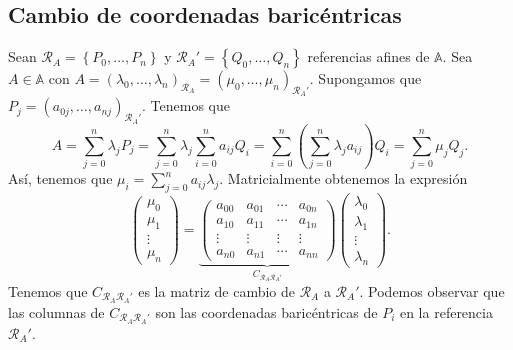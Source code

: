 \subsection{Cambio de coordenadas baricéntricas}
Sean $\displaystyle \mathcal{R}_{A} = \left\{ P_{0}, \ldots, P_{n}\right\}  $ y $\displaystyle \mathcal{R}_{A}' = \left\{ Q_{0}, \ldots, Q_{n}\right\}  $ referencias afines de $\displaystyle \mathbb{A} $. Sea $\displaystyle A \in \mathbb{A} $ con $\displaystyle A = \left(\lambda_{0}, \ldots, \lambda_{n}\right)_{\mathcal{R}_{A}} = \left(\mu_{0}, \ldots, \mu_{n}\right)_{\mathcal{R}_{A}'} $. Supongamos que $\displaystyle P_{j} = \left(a_{0j}, \ldots, a_{nj}\right)_{\mathcal{R}_{A}'} $.
Tenemos que
\[A = \sum^{n}_{j = 0}\lambda_{j}P_{j} = \sum^{n}_{j = 0}\lambda_{j}\sum^{n}_{i = 0}a_{ij}Q_{i} = \sum^{n}_{i = 0}\left(\sum^{n}_{j = 0}\lambda_{j}a_{ij}\right)Q_{i}= \sum^{n}_{j = 0}\mu_{j}Q_{j} .\]
Así, tenemos que $\displaystyle \mu_{i} = \sum^{n}_{j = 0}a_{ij}\lambda_{j} $.
Matricialmente obtenemos la expresión
\[\begin{pmatrix} \mu_{0} \\ \mu_{1} \\ \vdots \\ \mu_{n} \end{pmatrix} = \underbrace{\begin{pmatrix} a_{00} & a_{01} & \cdots & a_{0n} \\
a_{10} & a_{11} & \cdots & a_{1n} \\
\vdots & \vdots & \vdots & \vdots \\
a_{n0} & a_{n1} & \cdots & a_{nn}\end{pmatrix}}_{C_{\mathcal{R}_{A}\mathcal{R}_{A}'}}\begin{pmatrix} \lambda_{0} \\\lambda_{1} \\ \vdots \\ \lambda_{n} \end{pmatrix} .\]
Tenemos que $\displaystyle C_{\mathcal{R}_{A}\mathcal{R}_{A}'} $ es la matriz de cambio de $\displaystyle \mathcal{R}_{A} $ a $\displaystyle \mathcal{R}_{A}' $. Podemos observar que las columnas de $\displaystyle C_{\mathcal{R}_{A}\mathcal{R}_{A}'} $ son las coordenadas baricéntricas de $\displaystyle P_{i} $ en la referencia $\displaystyle \mathcal{R}_{A}' $.
